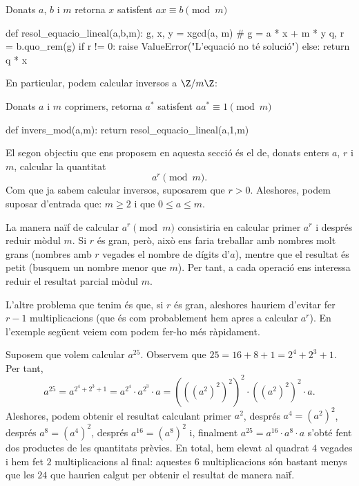 \begin{algo}
 \caption{Donats $a$, $b$ i $m$ retorna $x$ satisfent $ax\equiv b\pmod m$}
 \begin{python}
 def resol_equacio_lineal(a,b,m):
    g, x, y = xgcd(a, m) # g = a * x + m * y
    q, r = b.quo_rem(g)
    if r != 0:
        raise ValueError("L'equació no té solució")
    else:
        return q * x
 \end{python}
  \end{algo}
 
 En particular, podem calcular inversos a $\Z/m\Z$:
 
 \begin{algo}
 \caption{Donats $a$ i $m$ coprimers, retorna $a^*$ satisfent $aa^*\equiv 1\pmod m$}
 \begin{python}
 def invers_mod(a,m):
     return resol_equacio_lineal(a,1,m)
 \end{python}
 \end{algo}
 
  El segon objectiu que ens proposem en aquesta secció és el de, donats enters $a$, $r$ i $m$, calcular la quantitat
  \[
  a^r\pmod{m}.
  \]
  Com que ja sabem calcular inversos, suposarem que $r>0$. Aleshores, podem suposar d'entrada que: $m\geq 2$ i que $0\leq a\leq m$.
 
  La manera naïf de calcular $a^r\pmod{m}$ consistiria en calcular primer $a^r$ i després reduir mòdul $m$. Si $r$ és gran, però, això ens faria treballar amb nombres molt grans (nombres amb $r$ vegades el nombre de dígits d'$a$), mentre que el resultat és petit (busquem un nombre menor que $m$). Per tant, a cada operació ens interessa reduir el resultat parcial mòdul $m$.
  
 L'altre problema que tenim és que, si $r$ és gran, aleshores hauriem d'evitar fer $r-1$ multiplicacions (que és com probablement hem apres a calcular $a^r$). En l'exemple següent veiem com podem fer-ho més ràpidament.
 
 \begin{example}
  Suposem que volem calcular $a^{25}$. Observem que $25=16+8+1 = 2^4+2^3+1$. Per tant,
  \[
  a^{25} = a^{2^4+2^3+1}=a^{2^4}\cdot a^{2^3}\cdot a = (((a^2)^2)^2)^2\cdot ((a^2)^2)^2\cdot a.
  \]
  Aleshores, podem obtenir el resultat calculant primer $a^2$, després $a^4 = (a^2)^2$, després $a^8=(a^4)^2$, després $a^{16}=(a^8)^2$ i, finalment $a^{25}=a^{16}\cdot a^8\cdot a$ s'obté fent dos productes de les quantitats prèvies. En total, hem elevat al quadrat $4$ vegades i hem fet $2$ multiplicacions al final: aquestes $6$ multiplicacions són bastant menys que les $24$ que haurien calgut per obtenir el resultat de manera naïf.
 \end{example}
 
